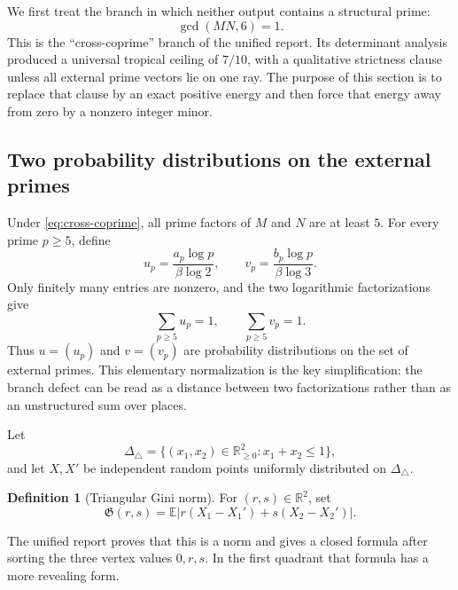 \documentclass[11pt,oneside]{article}
\theoremstyle{research}
\theoremstyle{definition}
\newtheorem{definition}[theorem]{Definition}
\newcommand{\R}{\mathbb R}
\begin{document}
We first treat the branch in which neither output contains a structural prime:
\begin{equation}
  \gcd(MN,6)=1.
  \label{eq:cross-coprime}
\end{equation}
This is the ``cross-coprime'' branch of the unified report.  Its determinant
analysis produced a universal tropical ceiling of $7/10$, with a qualitative
strictness clause unless all external prime vectors lie on one ray.  The
purpose of this section is to replace that clause by an exact positive energy
and then force that energy away from zero by a nonzero integer minor.

\subsection{Two probability distributions on the external primes}

Under \eqref{eq:cross-coprime}, all prime factors of $M$ and $N$ are at least
$5$.  For every prime $p\ge5$, define
\begin{equation}
 u_p=\frac{a_p\log p}{\beta\log2},
 \qquad
 v_p=\frac{b_p\log p}{\beta\log3}.
 \label{eq:uv-def}
\end{equation}
Only finitely many entries are nonzero, and the two logarithmic
factorizations give
\begin{equation}
 \sum_{p\ge5}u_p=1,
 \qquad
 \sum_{p\ge5}v_p=1.
 \label{eq:uv-probability}
\end{equation}
Thus $u=(u_p)$ and $v=(v_p)$ are probability distributions on the set of
external primes.  This elementary normalization is the key simplification:
the branch defect can be read as a distance between two factorizations rather
than as an unstructured sum over places.

Let
\[
 \Delta_\triangle
 =\{(x_1,x_2)\in\R_{\ge0}^2:x_1+x_2\le1\},
\]
and let $X,X'$ be independent random points uniformly distributed on
$\Delta_\triangle$.

\begin{definition}[Triangular Gini norm]
\label{def:gini}
For $(r,s)\in\R^2$, set
\begin{equation}
 \mathfrak G(r,s)
 =\mathbb E\left|r(X_1-X_1')+s(X_2-X_2')\right|.
 \label{eq:gini-def}
\end{equation}
\end{definition}

The unified report proves that this is a norm and gives a closed formula after
sorting the three vertex values $0,r,s$.  In the first quadrant that formula
has a more revealing form.
\end{document}
